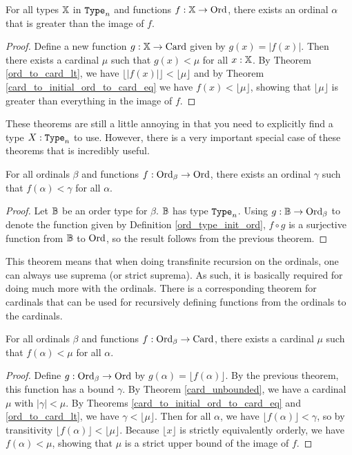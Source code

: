 \documentclass[../../math.tex]{subfiles}
\begin{document}
\begin{theorem} \label{ord_large}
    For all types $\mathbb{X}$ in $\Type_n$ and functions $f : \mathbb{X} \to \operatorname{Ord}$, there
    exists an ordinal $\alpha$ that is greater than the image of $f$.
\end{theorem}
\begin{proof}
    Define a new function $g : \mathbb{X} \to \operatorname{Card}$ given by $g(x) = |f(x)|$.  Then
    there exists a cardinal $\mu$ such that $g(x) < \mu$ for all $x : \mathbb{X}$.  By
    Theorem \ref{ord_to_card_lt}, we have $\lfloor | f(x) | \rfloor < \lfloor
    \mu \rfloor$ and by Theorem \ref{card_to_initial_ord_to_card_eq} we have
    $f(x) < \lfloor \mu \rfloor$, showing that $\lfloor \mu \rfloor$ is greater
    than everything in the image of $f$.
\end{proof}

These theorems are still a little annoying in that you need to explicitly find a
type $X : \Type_n$ to use.  However, there is a very important special case of
these theorems that is incredibly useful.

\begin{theorem} \label{ord_initial_small}
    For all ordinals $\beta$ and functions $f : \operatorname{Ord}_\beta \to \operatorname{Ord}$, there
    exists an ordinal $\gamma$ such that $f(\alpha) < \gamma$ for all $\alpha$.
\end{theorem}
\begin{proof}
    Let $\mathbb{B}$ be an order type for $\beta$.  $\mathbb{B}$ has type $\Type_n$.  Using $g :
    \mathbb{B} \to \operatorname{Ord}_\beta$ to denote the function given by Definition
    \ref{ord_type_init_ord}, $f \circ g$ is a surjective function from $\mathbb{B}$ to
    $\operatorname{Ord}$, so the result follows from the previous theorem.
\end{proof}

This theorem means that when doing transfinite recursion on the ordinals, one
can always use suprema (or strict suprema).  As such, it is basically required
for doing much more with the ordinals.  There is a corresponding theorem for
cardinals that can be used for recursively defining functions from the ordinals
to the cardinals.

\begin{theorem} \label{ord_card_large}
    For all ordinals $\beta$ and functions $f : \operatorname{Ord}_\beta \to \operatorname{Card}$, there
    exists a cardinal $\mu$ such that $f(\alpha) < \mu$ for all $\alpha$.
\end{theorem}
\begin{proof}
    Define $g : \operatorname{Ord}_\beta \to \operatorname{Ord}$ by $g(\alpha) = \lfloor f(\alpha) \rfloor$.
    By the previous theorem, this function has a bound $\gamma$.  By Theorem
    \ref{card_unbounded}, we have a cardinal $\mu$ with $|\gamma| < \mu$.  By
    Theorems \ref{card_to_initial_ord_to_card_eq} and \ref{ord_to_card_lt}, we
    have $\gamma < \lfloor \mu \rfloor$.  Then for all $\alpha$, we have
    $\lfloor f(\alpha) \rfloor < \gamma$, so by transitivity $\lfloor f(\alpha)
    \rfloor < \lfloor \mu \rfloor$.  Because $\lfloor x \rfloor$ is strictly
    equivalently orderly, we have $f(\alpha) < \mu$, showing that $\mu$ is a
    strict upper bound of the image of $f$.
\end{proof}
\end{document}
